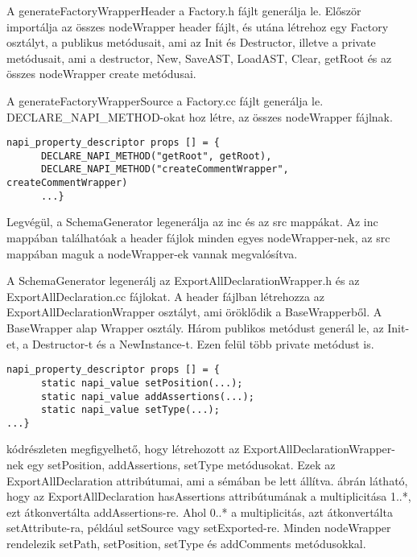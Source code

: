 A generateFactoryWrapperHeader a Factory.h fájlt generálja le.
Először importálja az összes nodeWrapper header fájlt, és utána létrehoz egy Factory osztályt, a publikus metódusait, ami az Init és Destructor, illetve a private metódusait,
ami a destructor, New, SaveAST, LoadAST, Clear, getRoot és az összes nodeWrapper create metódusai.

\noindent

A generateFactoryWrapperSource a Factory.cc fájlt generálja le.
DECLARE\_NAPI\_METHOD-okat hoz létre, az összes nodeWrapper fájlnak.

\begin{lstlisting}[caption={Factory.cc fájl}, label={lst:factory_cc}, language={CStyle}]
napi_property_descriptor props [] = {
      DECLARE_NAPI_METHOD("getRoot", getRoot),
      DECLARE_NAPI_METHOD("createCommentWrapper", createCommentWrapper)
      ...}
\end{lstlisting}

\noindent

Legvégül, a SchemaGenerator legenerálja az inc és az src mappákat.
Az inc mappában találhatóak a header fájlok minden egyes nodeWrapper-nek, az src mappában maguk a nodeWrapper-ek vannak megvalósítva.

\noindent

A SchemaGenerator legenerálj az ExportAllDeclarationWrapper.h és az ExportAllDeclaration.cc fájlokat.
A header fájlban létrehozza az ExportAllDeclarationWrapper osztályt, ami öröklődik a BaseWrapperből. A BaseWrapper alap Wrapper osztály.
Három publikos metódust generál le, az Init-et, a Destructor-t és a NewInstance-t.
Ezen felül több private metódust is.

\begin{lstlisting}[caption={ExportAllDeclarationWrapper.h fájl}, label={lst:ExportAllDeclarationWrapper_header}, language={CStyle}]
napi_property_descriptor props [] = {
      static napi_value setPosition(...);
      static napi_value addAssertions(...);
      static napi_value setType(...);
...}
\end{lstlisting}

 kódrészleten megfigyelhető, hogy létrehozott az ExportAllDeclarationWrapper-nek egy setPosition, addAssertions, setType metódusokat.
Ezek az ExportAllDeclaration attribútumai, ami a sémában be lett állítva.
 ábrán látható, hogy az ExportAllDeclaration hasAssertions attribútumának a multiplicitása 1..*, ezt átkonvertálta addAssertions-re.
Ahol 0..* a multiplicitás, azt átkonvertálta setAttribute-ra, például setSource vagy setExported-re.
Minden nodeWrapper rendelezik setPath, setPosition, setType és addComments metódusokkal.


